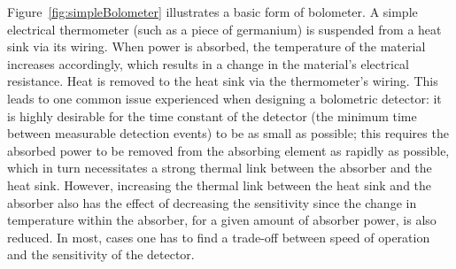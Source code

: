 Figure~\ref{fig:simpleBolometer} illustrates a basic form of bolometer. A simple electrical thermometer (such as a piece of germanium) is suspended from a heat sink via its wiring. When power is absorbed, the temperature of the material increases accordingly, which results in a change in the material's electrical resistance. Heat is removed to the heat sink via the thermometer's wiring. This leads to one common issue experienced when designing a bolometric detector: it is highly desirable  for the time constant of the detector (the minimum time between measurable detection events) to be as small as possible; this requires the absorbed power to be removed from the absorbing element as rapidly as possible, which in turn necessitates a strong thermal link between the absorber and the heat sink. However, increasing the thermal link between the heat sink and the absorber also has the effect of decreasing the sensitivity since the change in temperature within the absorber, for a given amount of absorber power, is also reduced. In most, cases one has to find a trade-off between speed of operation and the sensitivity of the detector. 

